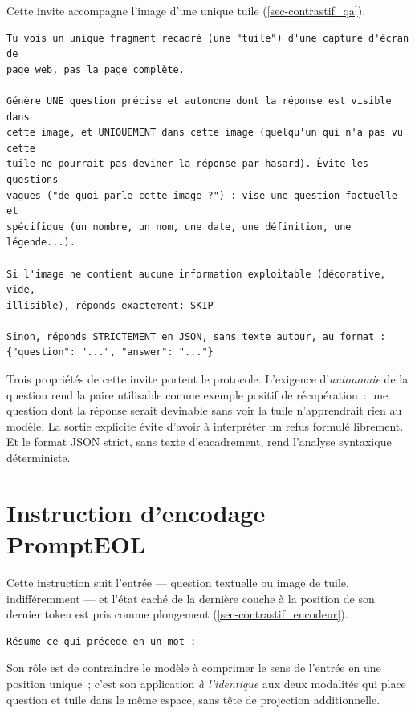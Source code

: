 Cette invite accompagne l'image d'une unique tuile
(\cref{sec-contrastif_qa}).

\begin{lstlisting}[language={}, frame=single, basicstyle=\ttfamily\scriptsize]
Tu vois un unique fragment recadré (une "tuile") d'une capture d'écran de
page web, pas la page complète.

Génère UNE question précise et autonome dont la réponse est visible dans
cette image, et UNIQUEMENT dans cette image (quelqu'un qui n'a pas vu cette
tuile ne pourrait pas deviner la réponse par hasard). Évite les questions
vagues ("de quoi parle cette image ?") : vise une question factuelle et
spécifique (un nombre, un nom, une date, une définition, une légende...).

Si l'image ne contient aucune information exploitable (décorative, vide,
illisible), réponds exactement: SKIP

Sinon, réponds STRICTEMENT en JSON, sans texte autour, au format :
{"question": "...", "answer": "..."}
\end{lstlisting}

Trois propriétés de cette invite portent le protocole. L'exigence
d'\emph{autonomie} de la question rend la paire utilisable comme exemple positif de
récupération~: une question dont la réponse serait devinable sans voir la tuile
n'apprendrait rien au modèle. La sortie  explicite évite d'avoir à
interpréter un refus formulé librement. Et le format JSON strict, sans texte
d'encadrement, rend l'analyse syntaxique déterministe.

\section{Instruction d'encodage PromptEOL}

Cette instruction suit l'entrée --- question textuelle ou image de tuile,
indifféremment --- et l'état caché de la dernière couche à la position de son
dernier token est pris comme plongement (\cref{sec-contrastif_encodeur}).

\begin{lstlisting}[language={}, frame=single, basicstyle=\ttfamily\scriptsize]
Résume ce qui précède en un mot :
\end{lstlisting}

Son rôle est de contraindre le modèle à comprimer le sens de l'entrée en une
position unique~; c'est son application \emph{à l'identique} aux deux modalités qui
place question et tuile dans le même espace, sans tête de projection additionnelle.

